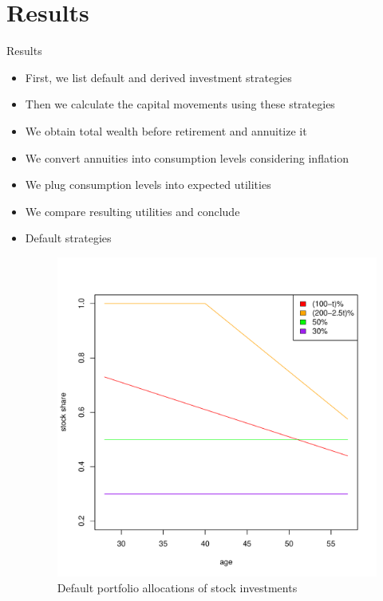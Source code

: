 \documentclass{beamer}
\begin{document}
\section{Results}

\begin{frame}[allowframebreaks]{Results}
  \begin{itemize}
	\item First, we list default and derived investment strategies
	\item Then we calculate the capital movements using these strategies
	\item We obtain total wealth before retirement and annuitize it
	\item We convert annuities into consumption levels considering inflation
	\item We plug consumption levels into expected utilities
	\item We compare resulting utilities and conclude

\framebreak

	\item Default strategies

\begin{figure}[h]
	\centering
	\includegraphics[scale=0.25]{figs/defaults.pdf}
	\caption{Default portfolio allocations of stock investments}
\end{figure}
		


\end{itemize}
\end{frame}
\end{document}

